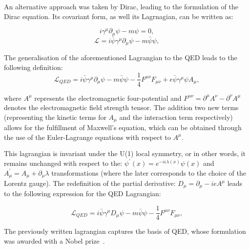 \hspace{10pt} An alternative approach was taken by Dirac, leading to the formulation of the Dirac equation. Its covariant form, as well its Lagrnagian, can be written as:

\begin{equation}
    i\gamma^{\mu}\partial_{\mu}\psi-m\psi = 0,
\end{equation}
\begin{equation}
\mathcal{L} = i\bar{\psi}\gamma^{\mu}\partial_{\mu}\psi  - m\bar{\psi}\psi,
\end{equation}

The generalisation of the aforementioned Lagrangian to the QED leads to the following definition:
\begin{equation}
    \mathcal{L}_{QED} = i\bar{\psi}\gamma^{\mu}\partial_{\mu}\psi  - m\bar{\psi}\psi - \frac{1}{4} F^{\mu\nu}F_{\mu\nu} + e\bar{\psi}\gamma^{\mu}\psi A_{\mu},
\end{equation}

where $A^{\mu}$ represents the electromagnetic four-potential and $F^{\mu\nu} = \partial^{\mu}A^{\nu}-\partial^{\nu}A^{\mu}$ denotes the electromagnetic field strength tensor. The addition two new terms (representing the kinetic terms for $A_{\mu}$ and the interaction term respectively) allows for the fulfillment of Maxwell's equation, which can be obtained through the use of the Euler-Lagrange equations with respect to $A^{\mu}$.

\hspace{10pt} This lagrangian is invariant under the U(1) local symmetry, or in other words, it remains unchanged with respect to the: $\psi^{'}(x) = e^{-i\epsilon\lambda(x)}\psi(x)$ and $A^{'}_{\mu} = A_{\mu} + \partial_{\mu}\lambda$ transformations (where the later corresponds to the choice of the Lorentz gauge). The redefinition of the partial derivative: $D_{\mu} = \partial_{\mu} - ieA^{\mu}$ leads to the following expression for the QED Lagrangian:

\begin{equation}
        \mathcal{L}_{QED} = i\bar{\psi}\gamma^{\mu}D_{\mu}\psi  - m\bar{\psi}\psi - \frac{1}{4} F^{\mu\nu}F_{\mu\nu},
\end{equation}

The previously written lagrangian captures the basis of QED, whose formulation was awarded with a Nobel prize~\cite{nobel_qed}.


